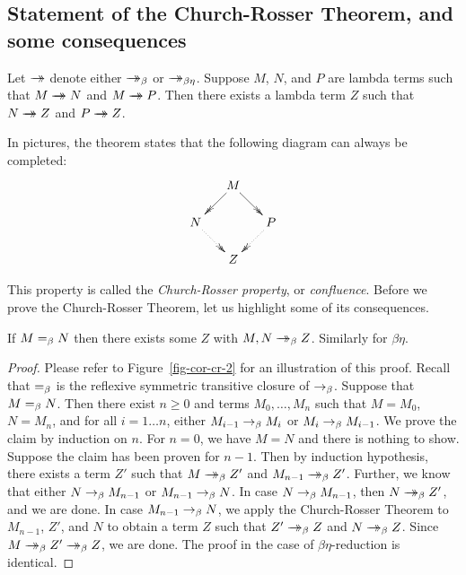 \documentclass{article}
\begin{document}
\subsection{Statement of the Church-Rosser Theorem, and some consequences}

\begin{un-theorem}\label{thm-church-rosser}
  Let $\mathrel{\rightarrow\!\!\!\!\!\rightarrow}$ denote either $\mathrel{\rightarrow\!\!\!\!\!\rightarrow}_{\beta}$ or $\mathrel{\rightarrow\!\!\!\!\!\rightarrow}_{\beta\eta}$.  Suppose $M$, $N$,
  and $P$ are lambda terms such that $M\mathrel{\rightarrow\!\!\!\!\!\rightarrow} N$ and $M\mathrel{\rightarrow\!\!\!\!\!\rightarrow} P$. Then
  there exists a lambda term $Z$ such that $N\mathrel{\rightarrow\!\!\!\!\!\rightarrow} Z$ and $P\mathrel{\rightarrow\!\!\!\!\!\rightarrow} Z$.
\end{un-theorem}

In pictures, the theorem states that the following diagram can always
be completed:
\[ \xymatrix@dr{M\ar@{->>}[r]\ar@{->>}[d] & P\ar@{.>>}[d]\\ N\ar@{.>>}[r] & Z}
\]

This property is called the {\em Church-Rosser property}, or {\em
  confluence}. Before we prove the Church-Rosser Theorem, let us
highlight some of its consequences.

\begin{corollary}\label{cor-cr-2}
  If $M=_{\beta} N$ then there exists some $Z$ with $M,N\mathrel{\rightarrow\!\!\!\!\!\rightarrow}_{\beta}
  Z$. Similarly for $\beta\eta$.
\end{corollary}

\begin{proof}
  Please refer to Figure~\ref{fig-cor-cr-2} for an illustration of
  this proof. Recall that $=_{\beta}$ is the reflexive symmetric transitive
  closure of $\rightarrow_{\beta}$. Suppose that $M=_{\beta} N$.  Then there exist $n\geq
  0$ and terms $M_0,\ldots,M_n$ such that $M=M_0$, $N=M_n$, and for
  all $i=1\ldots n$, either $M_{i-1}\rightarrow_{\beta} M_{i}$ or $M_{i}\rightarrow_{\beta}
  M_{i-1}$.  We prove the claim by induction on $n$. For $n=0$, we
  have $M=N$ and there is nothing to show. Suppose the claim has been
  proven for $n-1$. Then by induction hypothesis, there exists a term
  $Z'$ such that $M\mathrel{\rightarrow\!\!\!\!\!\rightarrow}_{\beta} Z'$ and $M_{n-1}\mathrel{\rightarrow\!\!\!\!\!\rightarrow}_{\beta} Z'$. Further, we know
  that either $N\rightarrow_{\beta} M_{n-1}$ or $M_{n-1}\rightarrow_{\beta} N$. In case $N\rightarrow_{\beta}
  M_{n-1}$, then $N\mathrel{\rightarrow\!\!\!\!\!\rightarrow}_{\beta} Z'$, and we are done. In case $M_{n-1}\rightarrow_{\beta}
  N$, we apply the Church-Rosser Theorem to $M_{n-1}$, $Z'$, and $N$
  to obtain a term $Z$ such that $Z'\mathrel{\rightarrow\!\!\!\!\!\rightarrow}_{\beta} Z$ and $N\mathrel{\rightarrow\!\!\!\!\!\rightarrow}_{\beta} Z$. Since
  $M\redbs Z'\redbs Z$, we are done. The proof in the case of
  $\beta\eta$-reduction is identical.\eot
\end{proof}
\end{document}
